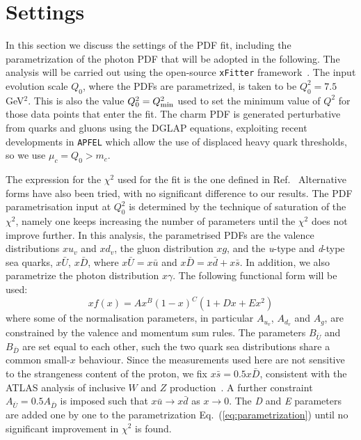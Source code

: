 \section{Settings}
\label{sec:fitsettings}

In this section we discuss the settings of
the PDF fit, including the parametrization of the photon PDF
that will be adopted in the following.
%
The analysis will be carried out using the open-source
{\tt xFitter} framework~\cite{Alekhin:2014irh}.
%
The input evolution scale $Q_0$, where the PDFs
are parametrized, is taken to be $Q^2_0 = 7.5~$GeV$^2$.
%
This is also the value $Q^2_0=Q^2_{\rm min}$ used to set the
minimum value of $Q^2$ for those data points that enter the fit.
%
The charm PDF is generated perturbative from quarks and gluons
using the DGLAP equations, exploiting recent developments
in {\tt APFEL} which allow the use of displaced heavy quark
thresholds, so we use $\mu_c=Q_0 > m_c$.

The  expression for the $\chi^2$ used for the fit is the one
defined in Ref.~\cite{Aaron:2009aa}
%
Alternative forms have also been tried,
with no significant difference to our results.
% 
The PDF parametrisation input at $Q^2_0$ is determined by the technique of saturation of the $\chi^{2}$, namely one keeps increasing
the number of parameters until the $\chi^{2}$ does not improve further.
%
In this analysis,
the parametrised PDFs are the valence distributions $xu_{v}$ and $xd_{v}$, the gluon distribution $xg$, and the \textit{u}-type and \textit{d}-type sea quarks, $x\bar{U}$, $x\bar{D}$, where $x\bar{U} = x\bar{u}$ and $x\bar{D} = x\bar{d} + x\bar{s}$.
%
In addition, we also parametrize the photon distribution $x\gamma$.
%
The following  functional form will be used:
\begin{equation}
  \label{eq:parametrization}
xf(x) = Ax^{B}(1-x)^{C}(1+Dx+Ex^{2})
\end{equation}
where some of the normalisation parameters, in particular
$A_{u_{v}}$, $A_{d_{v}}$ and $A_{g}$, are constrained by the valence and momentum
sum rules.
%
The  parameters $B_{\bar{U}}$ and $B_{\bar{D}}$ are set equal to each other, such
the two quark sea distributions share a common small-$x$ behaviour.
%
Since the measurements used here are not sensitive to the 
strangeness content of the proton, we fix $x\bar{s} = 0.5x\bar{D}$, consistent with
the ATLAS 
analysis of inclusive $W$ and $Z$ production~\cite{Aad:2012sb}.
%
A further constraint $A_{\bar{U}} = 0.5 A_{\bar{D}}$ is imposed such that $x\bar{u} \to x\bar{d}$ as $x \to 0$.
The \textit{D} and \textit{E} parameters are added one by one
to the parametrization Eq.~(\ref{eq:parametrization}) until no significant 
improvement in $\chi^{2}$ is found. 

